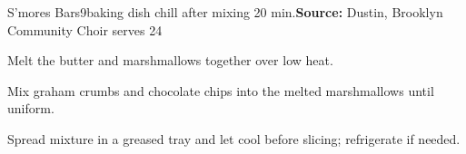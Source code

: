 \begin{recipe}{S'mores Bars}{9\inch{}\inch baking dish \hfill chill after mixing \hfill 20 min.}{\textbf{Source:} Dustin, Brooklyn Community Choir \hfill serves 24}

 Melt the butter and marshmallows together over low heat.

 Mix graham crumbs and chocolate chips into the melted marshmallows until uniform.

 \newstep Spread mixture in a greased tray and let cool before slicing; refrigerate if needed.
\end{recipe}

